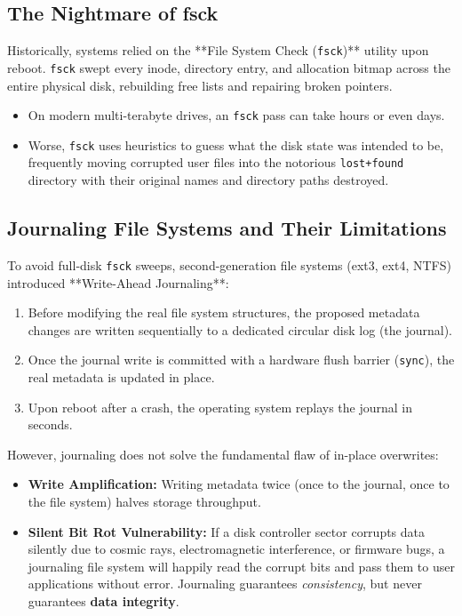 \subsection{The Nightmare of fsck}
Historically, systems relied on the **File System Check (\texttt{fsck})** utility upon reboot. \texttt{fsck} swept every inode, directory entry, and allocation bitmap across the entire physical disk, rebuilding free lists and repairing broken pointers.
\begin{itemize}
    \item On modern multi-terabyte drives, an \texttt{fsck} pass can take hours or even days.
    \item Worse, \texttt{fsck} uses heuristics to guess what the disk state was intended to be, frequently moving corrupted user files into the notorious \texttt{lost+found} directory with their original names and directory paths destroyed.
\end{itemize}

\subsection{Journaling File Systems and Their Limitations}
To avoid full-disk \texttt{fsck} sweeps, second-generation file systems (ext3, ext4, NTFS) introduced **Write-Ahead Journaling**:
\begin{enumerate}
    \item Before modifying the real file system structures, the proposed metadata changes are written sequentially to a dedicated circular disk log (the journal).
    \item Once the journal write is committed with a hardware flush barrier (\texttt{sync}), the real metadata is updated in place.
    \item Upon reboot after a crash, the operating system replays the journal in seconds.
\end{enumerate}

However, journaling does not solve the fundamental flaw of in-place overwrites:
\begin{itemize}
    \item \textbf{Write Amplification:} Writing metadata twice (once to the journal, once to the file system) halves storage throughput.
    \item \textbf{Silent Bit Rot Vulnerability:} If a disk controller sector corrupts data silently due to cosmic rays, electromagnetic interference, or firmware bugs, a journaling file system will happily read the corrupt bits and pass them to user applications without error. Journaling guarantees \textit{consistency}, but never guarantees \textbf{data integrity}.
\end{itemize}

